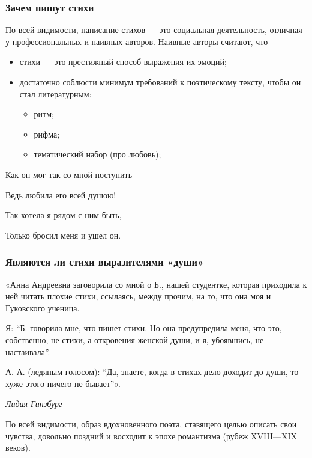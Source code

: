 \documentclass{beamer}
\begin{document}
\begin{frame}
\frametitle{Зачем пишут стихи}
По всей видимости, написание стихов — это социальная деятельность, отличная у профессиональных и наивных авторов.
Наивные авторы считают, что
\begin{itemize}
\item стихи — это престижный способ выражения их эмоций;
\item достаточно соблюсти минимум требований к поэтическому тексту, чтобы он стал литературным:
\begin{itemize}
\item ритм;
\item рифма;
\item тематический набор (про любовь);
\end{itemize}
\end{itemize}

Как он мог так со мной поступить –

Ведь любила его всей душою!

Так хотела я рядом с ним быть,

Только бросил меня и ушел он.


\end{frame}


\begin{frame}
\frametitle{Являются ли стихи выразителями «души»}
«Анна Андреевна заговорила со мной о Б., нашей студентке, которая приходила к ней читать плохие стихи, ссылаясь, между прочим, на то, что она моя и Гуковского ученица.

Я: “Б. говорила мне, что пишет стихи. Но она предупредила меня, что это, собственно, не стихи, а откровения женской души, и я, убоявшись, не настаивала”.

А. А. (ледяным голосом): “Да, знаете, когда в стихах дело доходит до души, то хуже этого ничего не бывает”».

\textit{Лидия Гинзбург}

\begin{flushleft}
По всей видимости, образ вдохновенного поэта, ставящего целью описать свои чувства, довольно поздний и восходит к эпохе романтизма (рубеж XVIII—XIX веков).
\end{flushleft}


\end{frame}

\end{document}
